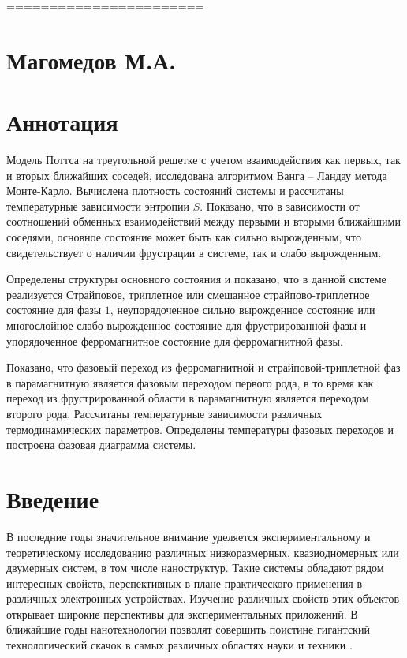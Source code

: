 
=======================


\section{Магомедов М.А.}








\section{Аннотация}

Модель Поттса на треугольной решетке с учетом взаимодействия как первых, так и вторых ближайших соседей, исследована алгоритмом Ванга -- Ландау метода Монте-Карло. Вычислена плотность состояний системы и рассчитаны температурные зависимости энтропии $S$. Показано, что в зависимости от соотношений обменных взаимодействий между первыми и вторыми ближайшими соседями, основное состояние может быть как сильно вырожденным, что свидетельствует о наличии фрустрации в системе, так и слабо вырожденным.

Определены структуры основного состояния и показано, что в данной системе реализуется Страйповое, триплетное или смешанное страйпово-триплетное состояние для фазы $1$, неупорядоченное сильно вырожденное состояние или многослойное слабо вырожденное состояние для фрустрированной фазы и упорядоченное ферромагнитное состояние для ферромагнитной фазы.

Показано, что фазовый переход из ферромагнитной и страйповой-триплетной фаз в парамагнитную является фазовым переходом первого рода, в то время как переход из фрустрированной области в парамагнитную является переходом второго рода. Рассчитаны температурные зависимости различных термодинамических параметров. Определены температуры фазовых переходов и построена фазовая диаграмма системы.




\section{Введение}


В последние годы  значительное внимание уделяется экспериментальному и теоретическому исследованию различных низкоразмерных, квазиодномерных или двумерных систем, в том числе наноструктур. Такие системы обладают рядом интересных свойств, перспективных в плане практического применения в различных электронных устройствах. Изучение различных свойств этих объектов открывает широкие перспективы для экспериментальных приложений. В ближайшие годы нанотехнологии позволят совершить поистине гигантский технологический скачок в самых различных областях науки и техники \cite{ph3_1}.

